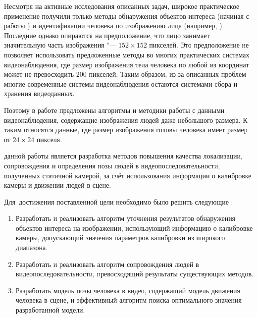 Несмотря на активные исследования описанных задач, широкое практическое применение получили только методы обнаружения объектов интереса (начиная с работы \cite{viola2001rapid}) и идентификации человека по изображению лица (например, \cite{taigman2014deepface,schroff2015facenet}). Последние однако опираются на предположение, что лицо занимает значительную часть изображения "--- $152\times152$ пикселей. Это предположение не позволяет использовать предложенные методы во многих практических системах видеонаблюдения, где размер изображения тела человека по любой из координат может не превосходить 200 пикселей. Таким образом, из-за описанных проблем многие современные системы видеонаблюдения остаются системами сбора и хранения видеоданных.

Поэтому в работе предложены алгоритмы и методики работы с данными видеонаблюдения, содержащие изображения людей даже небольшого размера. К таким относятся данные, где размер изображения головы человека имеет размер от $24\times24$ пикселя.


{\aim} данной работы является разработка методов повышения качества локализации, сопровождения и определения позы людей в видеопоследовательности, полученных статичной камерой, за счёт использования информации о калибровке камеры и движении людей в сцене.

Для~достижения поставленной цели необходимо было решить следующие {\tasks}:
\begin{enumerate}
	\item Разработать и реализовать алгоритм уточнения результатов обнаружения объектов интереса на изображении, использующий информацию о калибровке камеры, допускающий значения параметров калибровки из широкого диапазона.
	\item Разработать и реализовать алгоритм сопровождения людей в видеопоследовательности, превосходящий результаты существующих методов.
	\item Разработать модель позы человека в видео, содержащий модель движения человека в сцене, и эффективный алгоритм поиска оптимального значения разработанной модели.
\end{enumerate}

